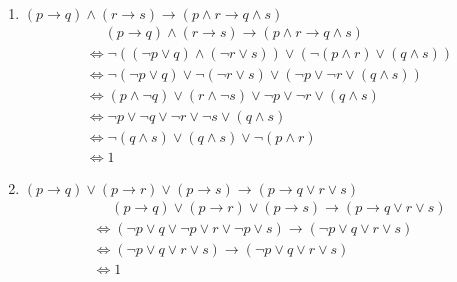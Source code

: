 \documentclass[UTF8]{ctexart}
\begin{document}
\begin{enumerate}
\begin{enumerate}
        \item $( p \rightarrow  q) \wedge  (r \rightarrow  s) \rightarrow  ( p \wedge  r \rightarrow  q \wedge  s)$
        \[
            \begin{aligned}
                &\mathrel{\phantom{=}}(p\rightarrow q)\wedge (r \rightarrow s)\rightarrow(p\wedge r \rightarrow q\wedge s)\\
                &\Leftrightarrow \neg((\neg p \vee q)\wedge (\neg r\vee s))\vee(\neg(p\wedge r)\vee (q \wedge s))\\
                &\Leftrightarrow \neg(\neg p\vee q) \vee \neg (\neg r \vee s)\vee (\neg p \vee \neg r \vee (q \wedge s))\\
                &\Leftrightarrow (p\wedge \neg q) \vee (r \wedge \neg s) \vee \neg p \vee \neg r \vee (q \wedge s)\\
                &\Leftrightarrow \neg p \vee \neg q \vee \neg r \vee \neg s \vee (q\wedge s)\\
                &\Leftrightarrow \neg(q\wedge s) \vee (q\wedge s) \vee \neg(p \wedge r)\\
                &\Leftrightarrow 1
            \end{aligned}
        \]
         
        
        \item $( p \rightarrow  q) \vee  ( p \rightarrow  r) \vee  ( p \rightarrow  s) \rightarrow  ( p \rightarrow  q \vee  r \vee  s )$
        \[
            \begin{aligned}
                &\mathrel{\phantom{=}}(p\rightarrow q)\vee (p \rightarrow r)\vee (p \rightarrow s)\rightarrow (p\rightarrow q\vee r \vee s)\\
                &\Leftrightarrow (\neg p \vee q \vee \neg p \vee r \vee \neg p \vee s )\rightarrow (\neg p \vee q \vee r \vee s)\\
                &\Leftrightarrow (\neg p \vee q \vee r \vee s )\rightarrow (\neg p \vee q \vee r \vee s)\\
                &\Leftrightarrow 1\\
            \end{aligned}
        \]
         

\end{enumerate}
\end{enumerate}
\end{document}
